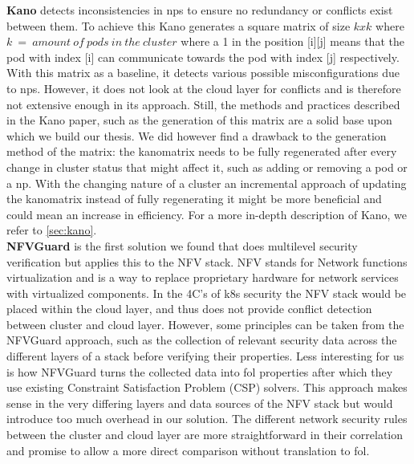 \textbf{Kano} \cite{kano} detects inconsistencies in \acrshort{np}s to ensure no redundancy or conflicts exist between them. 
To achieve this Kano generates a square matrix of size \(kxk\) where \(k\ =\ amount\  of\  pods\  in\  the\  cluster\) where a 1 in the position [i][j] means that the pod with index [i] can communicate towards the pod with index [j] respectively. With this matrix as a baseline, it detects various possible misconfigurations due to \acrshort{np}s. However, it does not look at the cloud layer for conflicts and is therefore not extensive enough in its approach. Still, the methods and practices described in the Kano paper, such as the generation of this matrix are a solid base upon which we build our thesis. We did however find a drawback to the generation method of the matrix: the kanomatrix needs to be fully regenerated after every change in cluster status that might affect it, such as adding or removing a pod or a \acrshort{np}. With the changing nature of a cluster an incremental approach of updating the kanomatrix instead of fully regenerating it might be more beneficial and could mean an increase in efficiency. For a more in-depth description of Kano, we refer to \autoref{sec:kano}.
\\[10pt]

\textbf{NFVGuard} \cite{nfvguard} is the first solution we found that does multilevel security verification but applies this to the NFV stack. NFV stands for Network functions virtualization and is a way to replace proprietary hardware for network services with virtualized components. In the 4C's of \acrshort{k8s} security the NFV stack would be placed within the cloud layer, and thus does not provide conflict detection between cluster and cloud layer. However, some principles can be taken from the NFVGuard approach, such as the collection of relevant security data across the different layers of a stack before verifying their properties. Less interesting for us is how NFVGuard turns the collected data into \acrfull{fol} properties after which they use existing Constraint Satisfaction Problem (CSP) solvers. This approach makes sense in the very differing layers and data sources of the NFV stack but would introduce too much overhead in our solution. The different network security rules between the cluster and cloud layer are more straightforward in their correlation and promise to allow a more direct comparison without translation to \acrshort{fol}.
\\[10pt]

